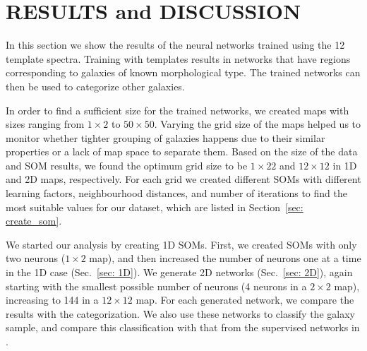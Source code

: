 \section{RESULTS and DISCUSSION}
\label{sec: result}

    In this section we show the results of the neural networks trained using the 12  template spectra.
    Training with  templates results in networks that have regions corresponding to galaxies of known morphological type. 
    The trained networks can then be used to categorize other galaxies.
   
    In order to find a sufficient size for the trained networks, we created maps with sizes ranging from $1\times2$ to $50\times50$.
    Varying the grid size of the maps helped us to monitor whether tighter grouping of galaxies happens due to their similar properties or a lack of map space to separate them.
    Based on the size of the data and SOM results, we found the optimum grid size to be $1\times22$ and $12\times12$ in 1D and 2D maps, respectively. 
    For each grid we created different SOMs with different learning factors, neighbourhood distances, and number of iterations to find the most suitable values for our dataset, which are listed in Section~\ref{sec: create_som}. %
    
    We started our analysis by creating 1D SOMs. 
    First, we created SOMs with only two neurons ($1\times2$ map), and then increased the number of neurons one at a time in the 1D case (Sec.~\ref{sec: 1D}).
    We generate 2D networks (Sec.~\ref{sec: 2D}),  again starting with the smallest possible number of neurons (4 neurons in a $2\times2$ map), increasing to 144 in a $12\times12$ map.    
    For each generated network, we compare the results with the  categorization.
    We also use these networks to classify the  galaxy sample, and compare this classification with that from the supervised networks in .

